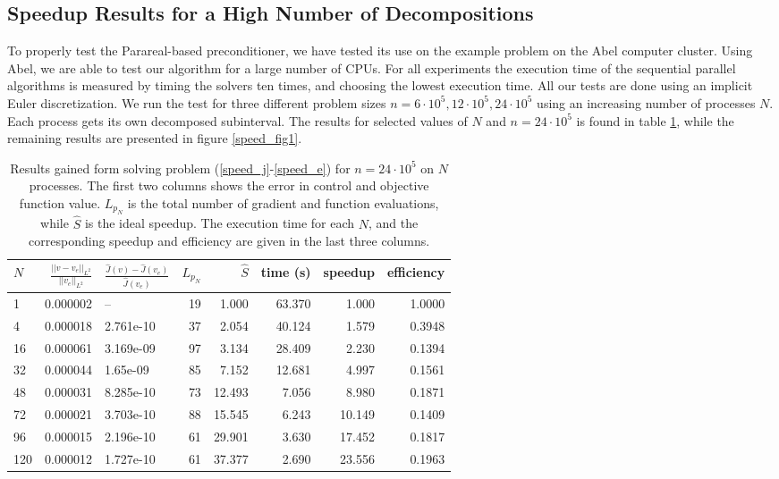 \subsection{Speedup Results for a High Number of Decompositions} \label{Aspeed_sec}
To properly test the Parareal-based preconditioner, we have tested its use on the example problem on the Abel computer cluster. Using Abel, we are able to test our algorithm for a large number of CPUs. For all experiments the execution time of the sequential parallel algorithms is measured by timing the solvers ten times, and choosing the lowest execution time. All our tests are done using an implicit Euler discretization. We run the test for three different problem sizes $n=6\cdot 10^5,12\cdot 10^5,24\cdot 10^5$ using an increasing number of processes $N$. Each process gets its own decomposed subinterval. The results for selected values of $N$ and $n= 24\cdot 10^5$ is found in table \ref{speed1}, while the remaining results are presented in figure \ref{speed_fig1}.
\\
\begin{table}[h]
\centering
\caption{Results gained form solving problem (\ref{speed_j}-\ref{speed_e}) for $n=24\cdot 10^5$ on $N$ processes. The first two columns shows the error in control and objective function value. $L_{p_N}$ is the total number of gradient and function evaluations, while $\hat S$ is the ideal speedup. The execution time for each $N$, and the corresponding speedup and efficiency are given in the last three columns.}
\label{speed1}
\begin{tabular}{lrlrrrrr}
\toprule
{}$N$ &   $\frac{||v-v_e||_{L^2}}{||v_e||_{L^2}}$ &     $\frac{\hat J(v)-\hat J(v_e)}{\hat{J}(v_e)}$ &   $L_{p_N}$ &     $\hat S$ &       time (s) &    speedup &        efficiency \\
\midrule
1   &  0.000002 &           -- &  19 &   1.000 &  63.370 &   1.000 &  1.0000 \\
4   &  0.000018 &  2.761e-10 &  37 &   2.054 &  40.124 &   1.579 &  0.3948 \\
16  &  0.000061 &  3.169e-09 &  97 &   3.134 &  28.409 &   2.230 &  0.1394 \\
32  &  0.000044 &   1.65e-09 &  85 &   7.152 &  12.681 &   4.997 &  0.1561 \\
48  &  0.000031 &  8.285e-10 &  73 &  12.493 &   7.056 &   8.980 &  0.1871 \\
72  &  0.000021 &  3.703e-10 &  88 &  15.545 &   6.243 &  10.149 &  0.1409 \\
96  &  0.000015 &  2.196e-10 &  61 &  29.901 &   3.630 &  17.452 &  0.1817 \\
120 &  0.000012 &  1.727e-10 &  61 &  37.377 &   2.690 &  23.556 &  0.1963 \\
\bottomrule
\end{tabular}
\end{table}
